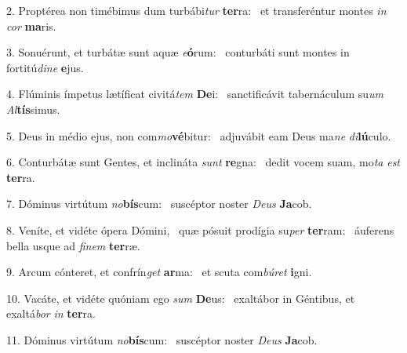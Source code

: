 2. Proptérea non timébimus dum turbábi\textit{tur} \textbf{ter}ra: \ast\  et transferéntur montes \textit{in} \textit{cor} \textbf{ma}ris.\

3. Sonuérunt, et turbátæ sunt aquæ \textit{e}\textbf{ó}rum: \ast\  conturbáti sunt montes in fortitú\textit{di}\textit{ne} \textbf{e}jus.\

4. Flúminis ímpetus lætíficat civitá\textit{tem} \textbf{De}i: \ast\  sanctificávit tabernáculum su\textit{um} \textit{Al}\textbf{tís}simus.\

5. Deus in médio ejus, non com\textit{mo}\textbf{vé}bitur: \ast\  adjuvábit eam Deus ma\textit{ne} \textit{di}\textbf{lú}culo.\

6. Conturbátæ sunt Gentes, et inclináta \textit{sunt} \textbf{re}gna: \ast\  dedit vocem suam, mo\textit{ta} \textit{est} \textbf{ter}ra.\

7. Dóminus virtútum \textit{no}\textbf{bís}cum: \ast\  suscéptor noster \textit{De}\textit{us} \textbf{Ja}cob.\

8. Veníte, et vidéte ópera Dómini, \dag\  quæ pósuit prodígia su\textit{per} \textbf{ter}ram: \ast\  áuferens bella usque ad \textit{fi}\textit{nem} \textbf{ter}ræ.\

9. Arcum cónteret, et confrín\textit{get} \textbf{ar}ma: \ast\  et scuta com\textit{bú}\textit{ret} \textbf{i}gni.\

10. Vacáte, et vidéte quóniam ego \textit{sum} \textbf{De}us: \ast\  exaltábor in Géntibus, et exaltá\textit{bor} \textit{in} \textbf{ter}ra.\

11. Dóminus virtútum \textit{no}\textbf{bís}cum: \ast\  suscéptor noster \textit{De}\textit{us} \textbf{Ja}cob.\

